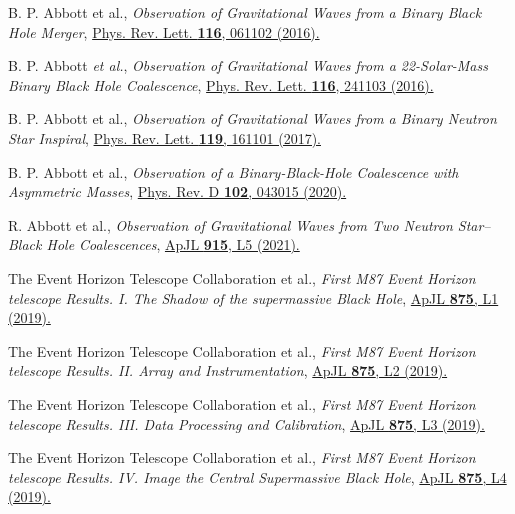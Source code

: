 \documentclass[aps,amsmath,amssymb,showpacs,showkeys]{revtex4}
\begin{document}


\begin{thebibliography}{99}

B. P. Abbott et al., \textit{Observation of Gravitational Waves from a Binary Black Hole Merger}, \href{https://doi.org/10.1103/PhysRevLett.116.061102}{Phys. Rev. Lett. \textbf{116}, 061102 (2016).}

B. P. Abbott \textit{et al.}, \textit{Observation of Gravitational Waves from a 22-Solar-Mass Binary Black Hole Coalescence}, \href{https://doi.org/10.1103/PhysRevLett.116.241103}{Phys. Rev. Lett. \textbf{116}, 241103 (2016).}

B. P. Abbott et al., \textit{Observation of Gravitational Waves from a Binary Neutron Star Inspiral}, \href{https://doi.org/10.1103/PhysRevLett.119.161101}{Phys. Rev. Lett. \textbf{119}, 161101 (2017).}

B. P. Abbott et al., \textit{Observation of a Binary-Black-Hole Coalescence with Asymmetric Masses}, \href{https://doi.org/10.1103/PhysRevD.102.043015}{Phys. Rev. D \textbf{102}, 043015 (2020).}

R. Abbott et al., \textit{Observation of Gravitational Waves from Two Neutron Star–Black Hole Coalescences}, \href{https://doi.org/10.3847/2041-8213/ac082e}{ApJL \textbf{915}, L5 (2021).}

The Event Horizon Telescope Collaboration et al., \textit{First M87 Event Horizon telescope Results. I. The Shadow of the supermassive Black Hole}, \href{https://iopscience.iop.org/article/10.3847/2041-8213/ab0ec7}{ApJL \textbf{875}, L1 (2019).}

The Event Horizon Telescope Collaboration et al., \textit{First M87 Event Horizon telescope Results. II. Array and Instrumentation}, \href{https://iopscience.iop.org/article/10.3847/2041-8213/ab0c96}{ApJL \textbf{875}, L2 (2019).}

The Event Horizon Telescope Collaboration et al., \textit{First M87 Event Horizon telescope Results. III. Data Processing and Calibration}, \href{https://iopscience.iop.org/article/10.3847/2041-8213/ab0c57}{ApJL \textbf{875}, L3 (2019).}

The Event Horizon Telescope Collaboration et al., \textit{First M87 Event Horizon telescope Results. IV. Image the Central Supermassive Black Hole}, \href{https://iopscience.iop.org/article/10.3847/2041-8213/ab0e85}{ApJL \textbf{875}, L4 (2019).}


\end{thebibliography}
\end{document}
